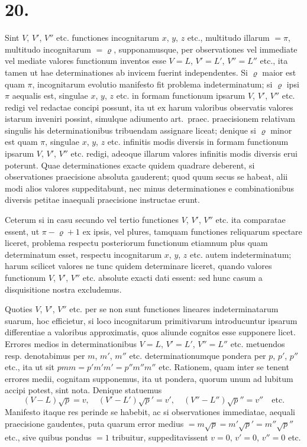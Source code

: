 \documentclass[12pt,a4paper]{book}
\begin{document}
\section*{20.}
\label{sec:art20}

Sint $V$, $V'$, $V''$ etc. functiones incognitarum $x$, $y$, $z$ etc., multitudo illarum $=\pi$, multitudo incognitarum $=\varrho$, supponamusque, per observationes vel immediate vel mediate valores functionum inventos esse $V=L$, $V'=L'$, $V''=L''$ etc., ita tamen ut hae determinationes ab invicem fuerint independentes. Si $\varrho$ maior est quam $\pi$, incognitarum evolutio manifesto fit problema indeterminatum; si $\varrho$ ipsi $\pi$ aequalis est, singulae $x$, $y$, $z$ etc. in formam functionum ipsarum $V$, $V'$, $V''$ etc. redigi vel redactae concipi possunt, ita ut ex harum valoribus observatis valores istarum inveniri possint, simulque adiumento art.~praec. praecisionem relativam singulis his determinationibus tribuendam assignare liceat; denique si $\varrho$ minor est quam $\pi$, singulae $x$, $y$, $z$ etc. infinitis modis diversis in formam functionum ipsarum $V$, $V'$, $V''$ etc. redigi, adeoque illarum valores infinitis modis diversis erui poterunt. Quae determinationes exacte quidem quadrare deberent, si observationes praecisione absoluta gauderent; quod quum secus se habeat, alii modi alios valores suppeditabunt, nec minus determinationes e combinationibus diversis petitae inaequali praecisione instructae erunt.

Ceterum si in casu secundo vel tertio functiones $V$, $V'$, $V''$ etc. ita comparatae essent, ut $\pi-\varrho+1$ ex ipsis, vel plures, tamquam functiones reliquarum spectare liceret, problema respectu posteriorum functionum etiamnum plus quam determinatum esset, respectu incognitarum $x$, $y$, $z$ etc. autem indeterminatum; harum scilicet valores ne tunc quidem determinare liceret, quando valores functionum $V$, $V'$, $V''$ etc. absolute exacti dati essent: sed hunc casum a disquisitione nostra excludemus.

Quoties $V$, $V'$, $V''$ etc. per se non sunt functiones lineares indeterminatarum suarum, hoc efficietur, si loco incognitarum primitivarum introducuntur ipsarum differentiae a valoribus approximatis, quos aliunde cognitos esse supponere licet. Errores medios in determinationibus $V=L$, $V'=L'$, $V''=L''$ etc. metuendos resp. denotabimus per $m$, $m'$, $m''$ etc. determinationumque pondera per $p$, $p'$, $p''$ etc., ita ut sit $pmm=p'm'm'=p''m''m''$ etc. Rationem, quam inter se tenent errores medii, cognitam supponemus, ita ut pondera, quorum unum ad lubitum accipi potest, sint nota. Denique statuemus
%
\begin{equation*}
(V-L)\surd p=v,\quad (V'-L')\surd p'=v',\quad (V''-L'')\surd p''=v''\quad\text{etc.}
\end{equation*}
Manifesto itaque res perinde se habebit, ac si observationes immediatae, aequali praecisione gaudentes, puta quarum error medius $=m\surd p=m'\surd p'=m''\surd p''$ etc., sive quibus pondus $=1$ tribuitur, suppeditavissent $v=0$, $v'=0$, $v''=0$ etc.
\end{document}

